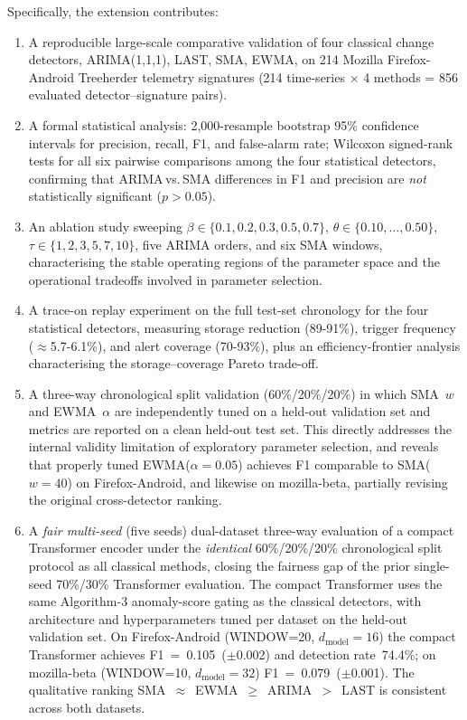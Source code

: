 \documentclass[pdflatex,sn-nature]{sn-jnl}
\theoremstyle{thmstyleone}%
\begin{document}
Specifically, the extension contributes:

\begin{enumerate}
  \item A reproducible large-scale comparative validation of four classical
    change detectors, ARIMA(1,1,1), LAST, SMA, EWMA, on 214 Mozilla
    Firefox-Android Treeherder telemetry signatures
    (214 time-series $\times$ 4 methods = 856 evaluated detector--signature pairs).
  \item A formal statistical analysis: 2,000-resample bootstrap 95\% confidence
    intervals for precision, recall, F1, and false-alarm rate; Wilcoxon
    signed-rank tests for all six pairwise comparisons among the four
    statistical detectors, confirming that ARIMA\,vs.\,SMA differences in
    F1 and precision are \emph{not} statistically significant ($p > 0.05$).
  \item An ablation study sweeping $\beta \in \{0.1,0.2,0.3,0.5,0.7\}$,
    $\theta \in \{0.10,\ldots,0.50\}$, $\tau \in \{1,2,3,5,7,10\}$,
    five ARIMA orders, and six SMA windows, characterising the stable operating
    regions of the parameter space and the operational tradeoffs involved
    in parameter selection.
  \item A trace-on replay experiment on the full test-set chronology for the
    four statistical detectors, measuring
    storage reduction (89-91\%), trigger frequency ($\approx$5.7-6.1\%),
    and alert coverage (70-93\%), plus an efficiency-frontier
    analysis characterising the storage--coverage Pareto trade-off.
  \item A three-way chronological split validation (60\%/20\%/20\%) in which
    SMA~$w$ and EWMA~$\alpha$ are independently tuned on a held-out
    validation set and metrics are reported on a clean held-out test set.
    This directly addresses the internal validity limitation of
    exploratory parameter selection, and reveals that properly tuned
    EWMA($\alpha=0.05$) achieves F1 comparable to SMA($w=40$) on
    Firefox-Android, and likewise on mozilla-beta, partially
    revising the original cross-detector ranking.
  \item A \emph{fair multi-seed} (five seeds) dual-dataset three-way evaluation
    of a compact Transformer encoder under the \emph{identical}
    60\%/20\%/20\% chronological split protocol as all classical methods,
    closing the fairness gap of the prior single-seed 70\%/30\% Transformer
    evaluation.  The compact Transformer uses the same Algorithm-3
    anomaly-score gating as the classical detectors, with architecture
    and hyperparameters tuned per dataset on the held-out validation set.
    On Firefox-Android (WINDOW=20, $d_{\text{model}}=16$) the compact
    Transformer achieves F1~=~0.105~($\pm$0.002) and detection rate~74.4\%;
    on mozilla-beta (WINDOW=10, $d_{\text{model}}=32$) F1~=~0.079~($\pm$0.001).
    The qualitative ranking SMA~$\approx$~EWMA~$\geq$~ARIMA~$>$~LAST is
    consistent across both datasets.
\end{enumerate}
\end{document}
